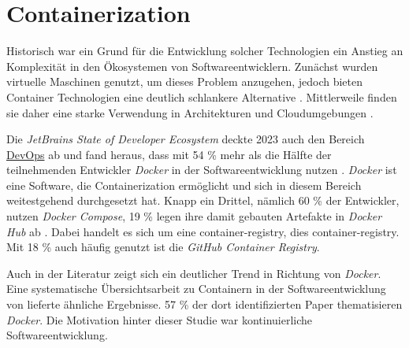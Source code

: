 \section{Containerization}
\label{sec:02-03_containerization}

 \cite{023:Setting-up-CI-CD-Pipeline-in-the-Cloud-for-Web-Application}

Historisch war ein Grund für die Entwicklung solcher Technologien ein Anstieg an Komplexität in den Ökosystemen von Softwareentwicklern. Zunächst wurden virtuelle Maschinen genutzt, um dieses Problem anzugehen, jedoch bieten Container Technologien eine deutlich schlankere Alternative \cite{014:Managing-Container-based-Software-Development-Environments}. Mittlerweile finden sie daher eine starke Verwendung in  Architekturen \cite{014:Managing-Container-based-Software-Development-Environments} und Cloudumgebungen \cite{025:Exploring-Solutions-for-Container-Image-Security}.

Die \textit{JetBrains State of Developer Ecosystem} deckte 2023 auch den Bereich \hyperref[sec:03-01_introduction-to-devops]{DevOps} ab und fand heraus, dass mit 54 \% mehr als die Hälfte der teilnehmenden Entwickler \textit{Docker} in der Softwareentwicklung nutzen \cite{207:Developer-Ecosystem}. \textit{Docker} ist eine Software, die Containerization ermöglicht und sich in diesem Bereich weitestgehend durchgesetzt hat. Knapp ein Drittel, nämlich 60 \% der Entwickler, nutzen \textit{Docker Compose}, 19 \% legen ihre damit gebauten Artefakte in \textit{Docker Hub} ab \cite{207:Developer-Ecosystem}. Dabei handelt es sich um eine \Gls{container-registry}, dies \glsdesc{container-registry}. Mit 18 \% auch häufig genutzt ist die \textit{GitHub Container Registry}.

Auch in der Literatur zeigt sich ein deutlicher Trend in Richtung von \textit{Docker}. Eine systematische Übersichtsarbeit zu Containern in der Softwareentwicklung von \citeauthor{015:Containers-in-Software-Development} lieferte ähnliche Ergebnisse. 57 \% der dort identifizierten Paper thematisieren \textit{Docker}. Die Motivation hinter dieser Studie war kontinuierliche Softwareentwicklung. \cite{015:Containers-in-Software-Development}

